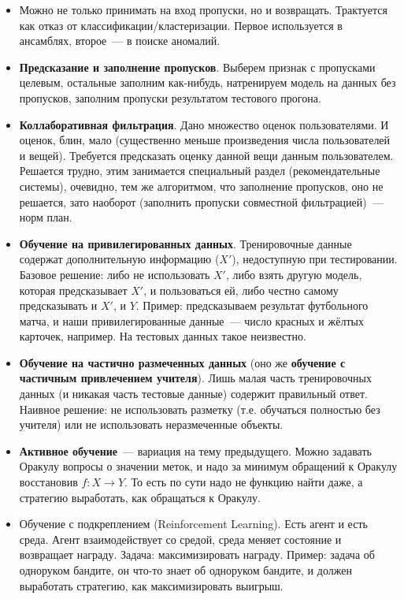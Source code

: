 \documentclass{article}
\begin{document}
    \begin{itemize}
        \item Можно не только принимать на вход пропуски, но и возвращать. Трактуется как отказ от классификации/кластеризации. Первое используется в ансамблях, второе~--- в поиске аномалий.
        \item \textbf{Предсказание и заполнение пропусков}. Выберем признак с пропусками целевым, остальные заполним как-нибудь, натренируем модель на данных без пропусков, заполним пропуски результатом тестового прогона.
        \item \textbf{Коллаборативная фильтрация}. Дано множество оценок пользователями. И оценок, блин, мало (существенно меньше произведения числа пользователей и вещей). Требуется предсказать оценку данной вещи данным пользователем. Решается трудно, этим занимается специальный раздел (рекомендательные системы), очевидно, тем же алгоритмом, что заполнение пропусков, оно не решается, зато наоборот (заполнить пропуски совместной фильтрацией)~--- норм план.
        \item \textbf{Обучение на привилегированных данных}. Тренировочные данные содержат дополнительную информацию ($X'$), недоступную при тестировании. Базовое решение: либо не использовать $X'$, либо взять другую модель, которая предсказывает $X'$, и пользоваться ей, либо честно самому предсказывать и $X'$, и $Y$. Пример: предсказываем результат футбольного матча, и наши привилегированные данные~--- число красных и жёлтых карточек, например. На тестовых данных такое неизвестно.
        \item \textbf{Обучение на частично размеченных данных} (оно же \textbf{обучение с частичным привлечением учителя}). Лишь малая часть тренировочных данных (и никакая часть тестовые данные) содержит правильный ответ. Наивное решение: не использовать разметку (т.е. обучаться полностью без учителя) или не использовать неразмеченные объекты.
        \item \textbf{Активное обучение}~--- вариация на тему предыдущего. Можно задавать Оракулу вопросы о значении меток, и надо за минимум обращений к Оракулу восстановив $f\colon X\to Y$. То есть по сути надо не функцию найти даже, а стратегию выработать, как обращаться к Оракулу.
        \item Обучение с подкреплением (Reinforcement Learning). Есть агент и есть среда. Агент взаимодействует со средой, среда меняет состояние и возвращает награду. Задача: максимизировать награду. Пример: задача об одноруком бандите, он что-то знает об одноруком бандите, и должен выработать стратегию, как максимизировать выигрыш.
    \end{itemize}
\end{document}
